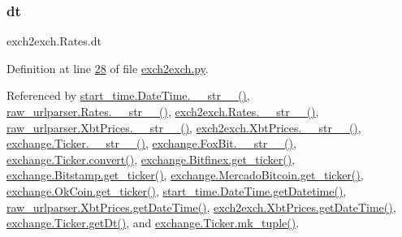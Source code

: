 \mbox{\label{classexch2exch_1_1_rates_acb12f83bce4393714ec30351a1d636c2}} 
\subsubsection{\texorpdfstring{dt}{dt}}
{\footnotesize\ttfamily exch2exch.\+Rates.\+dt}



Definition at line \hyperlink{exch2exch_8py_source_l00028}{28} of file \hyperlink{exch2exch_8py_source}{exch2exch.\+py}.



Referenced by \hyperlink{start__time_2____init_____8py_source_l00034}{start\+\_\+time.\+Date\+Time.\+\_\+\+\_\+str\+\_\+\+\_\+()}, \hyperlink{raw__urlparser_8py_source_l00038}{raw\+\_\+urlparser.\+Rates.\+\_\+\+\_\+str\+\_\+\+\_\+()}, \hyperlink{exch2exch_8py_source_l00042}{exch2exch.\+Rates.\+\_\+\+\_\+str\+\_\+\+\_\+()}, \hyperlink{raw__urlparser_8py_source_l00074}{raw\+\_\+urlparser.\+Xbt\+Prices.\+\_\+\+\_\+str\+\_\+\+\_\+()}, \hyperlink{exch2exch_8py_source_l00091}{exch2exch.\+Xbt\+Prices.\+\_\+\+\_\+str\+\_\+\+\_\+()}, \hyperlink{exchange_8py_source_l00136}{exchange.\+Ticker.\+\_\+\+\_\+str\+\_\+\+\_\+()}, \hyperlink{exchange_8py_source_l00610}{exchange.\+Fox\+Bit.\+\_\+\+\_\+str\+\_\+\+\_\+()}, \hyperlink{exchange_8py_source_l00069}{exchange.\+Ticker.\+convert()}, \hyperlink{exchange_8py_source_l00439}{exchange.\+Bitfinex.\+get\+\_\+ticker()}, \hyperlink{exchange_8py_source_l00511}{exchange.\+Bitstamp.\+get\+\_\+ticker()}, \hyperlink{exchange_8py_source_l00651}{exchange.\+Mercado\+Bitcoin.\+get\+\_\+ticker()}, \hyperlink{exchange_8py_source_l00716}{exchange.\+Ok\+Coin.\+get\+\_\+ticker()}, \hyperlink{start__time_2____init_____8py_source_l00031}{start\+\_\+time.\+Date\+Time.\+get\+Datetime()}, \hyperlink{raw__urlparser_8py_source_l00059}{raw\+\_\+urlparser.\+Xbt\+Prices.\+get\+Date\+Time()}, \hyperlink{exch2exch_8py_source_l00067}{exch2exch.\+Xbt\+Prices.\+get\+Date\+Time()}, \hyperlink{exchange_8py_source_l00097}{exchange.\+Ticker.\+get\+Dt()}, and \hyperlink{exchange_8py_source_l00121}{exchange.\+Ticker.\+mk\+\_\+tuple()}.

\mbox{\label{classexch2exch_1_1_rates_a94c1394b9259d6a7c8f3c12bbd20e685}} 
